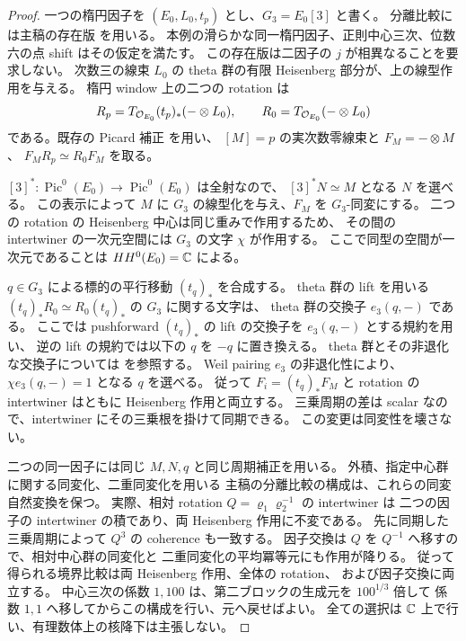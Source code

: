 \begin{proof}
一つの楕円因子を $(E_0,L_0,t_p)$ とし、$G_3=E_0[3]$ と書く。
分離比較には主稿の存在版
を用いる。
本例の滑らかな同一楕円因子、正則中心三次、位数六の点 shift はその仮定を満たす。
この存在版は二因子の $j$ が相異なることを要求しない。
次数三の線束 $L_0$ の theta 群の有限 Heisenberg 部分が、上の線型作用を与える。
楕円 window 上の二つの rotation は
\[
 R_p=T_{\mathcal O_{E_0}}(t_p)_*(-\otimes L_0),\qquad
 R_0=T_{\mathcal O_{E_0}}(-\otimes L_0)
\]
である。既存の Picard 補正
を用い、
$[M]=p$ の実次数零線束と $F_M=-\otimes M$、
$F_MR_p\simeq R_0F_M$ を取る。

$[3]^*:\operatorname{Pic}^0(E_0)\to\operatorname{Pic}^0(E_0)$ は全射なので、
$[3]^*N\simeq M$ となる $N$ を選べる。
この表示によって $M$ に $G_3$ の線型化を与え、$F_M$ を $G_3$-同変にする。
二つの rotation の Heisenberg 中心は同じ重みで作用するため、
その間の intertwiner の一次元空間には $G_3$ の文字 $\chi$ が作用する。
ここで同型の空間が一次元であることは $HH^0(E_0)=\mathbb C$ による。

$q\in G_3$ による標的の平行移動 $(t_q)_*$ を合成する。
theta 群の lift を用いる
$(t_q)_*R_0\simeq R_0(t_q)_*$ の $G_3$ に関する文字は、
theta 群の交換子 $e_3(q,-)$ である。
ここでは pushforward $(t_q)_*$ の lift の交換子を $e_3(q,-)$ とする規約を用い、
逆の lift の規約では以下の $q$ を $-q$ に置き換える。
theta 群とその非退化な交換子については
\cite[Sections~1.3 and~1.6, Definition~1.29]{NFMCremonaFisherDescentAlgebra}を参照する。
Weil pairing $e_3$ の非退化性により、$\chi e_3(q,-)=1$ となる $q$ を選べる。
従って $F_i=(t_q)_*F_M$ と rotation の intertwiner はともに
Heisenberg 作用と両立する。
三乗周期の差は scalar なので、intertwiner にその三乗根を掛けて同期できる。
この変更は同変性を壊さない。

二つの同一因子には同じ $M,N,q$ と同じ周期補正を用いる。
外積、指定中心群に関する同変化、二重同変化を用いる
主稿の分離比較の構成は、これらの同変自然変換を保つ。
実際、相対 rotation $Q=\varrho_1\varrho_2^{-1}$ の intertwiner は
二つの因子の intertwiner の積であり、両 Heisenberg 作用に不変である。
先に同期した三乗周期によって $Q^3$ の coherence も一致する。
因子交換は $Q$ を $Q^{-1}$ へ移すので、相対中心群の同変化と
二重同変化の平均冪等元にも作用が降りる。
従って得られる境界比較は両 Heisenberg 作用、全体の rotation、
および因子交換に両立する。
中心三次の係数 $1,100$ は、第二ブロックの生成元を $100^{1/3}$ 倍して
係数 $1,1$ へ移してからこの構成を行い、元へ戻せばよい。
全ての選択は $\mathbb C$ 上で行い、有理数体上の核降下は主張しない。
\end{proof}


